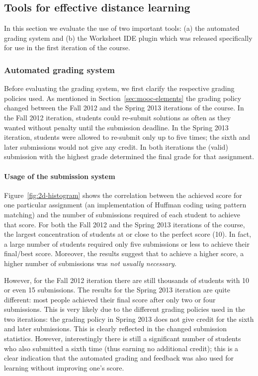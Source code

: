 \documentclass{sig-alternate}
\begin{document}
\subsection{Tools for effective distance learning}

In this section we evaluate the use of two important tools: (a) the automated
grading system and (b) the Worksheet IDE plugin which was released
specifically for use in the first iteration of the course.

\subsubsection{Automated grading system}

Before evaluating the grading system, we first clarify the respective grading
policies used. As mentioned in Section~\ref{sec:mooc-elements} the grading
policy changed between the Fall 2012 and the Spring 2013 iterations of the
course. In the Fall 2012 iteration, students could re-submit solutions as
often as they wanted without penalty until the submission deadline. In the
Spring 2013 iteration, students were allowed to re-submit only up to five
times; the sixth and later submissions would not give any credit. In both
iterations the (valid) submission with the highest grade determined the final
grade for that assignment.

\paragraph{Usage of the submission system}

Figure~\ref{fig:2d-histogram} shows the correlation between the achieved
score for one particular assignment (an implementation of Huffman coding using
pattern matching) and the number of submissions required of each student to achieve that
score. For both the Fall 2012 and the Spring 2013 iterations of the course,
the largest concentration of students at or close to the perfect score
(10). In fact, a large number of students required only five submissions or less to
achieve their final/best score. Moreover, the results suggest that to achieve
a higher score, a higher number of submissions was {\em not usually necessary}.

However, for the Fall 2012 iteration there are still thousands of students
with 10 or even 15 submissions. The results for the Spring 2013 iteration are
quite different: most people achieved their final score after only two or four
submissions. This is very likely due to the different grading policies used in
the two iterations: the grading policy in Spring 2013 does not give credit for
the sixth and later submissions. This is clearly reflected in the changed
submission statistics. However, interestingly there is still a significant
number of students who also submitted a sixth time (thus earning no additional
credit); this is a clear indication that the automated grading and feedback
was also used for learning without improving one's score.
\end{document}
